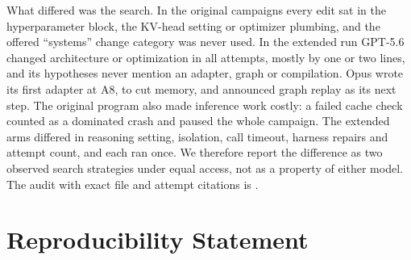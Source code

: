 \documentclass{article}
\begin{document}
\begin{table}[H]
\caption{The inference-editing surface and conditions of each AutoPareto search, read from the candidate sources and attempt records. ``Own inference code'' counts candidate sources that define the hook. Opus's failed A9 also wrote one, but its source was not kept. Opus's evaluator change fixed an FP32 correctness check that crashed on the first candidate adapter (A8), which was then re-run unchanged.}\label{tab:access}
\centering\scriptsize\setlength{\tabcolsep}{3pt}\renewcommand{\arraystretch}{1.12}
\end{table}

What differed was the search. In the original campaigns every edit sat in the hyperparameter block, the KV-head setting or optimizer plumbing, and the offered ``systems'' change category was never used. In the extended run GPT-5.6 changed architecture or optimization in all \CRCxAttempts{} attempts, mostly by one or two lines, and its hypotheses never mention an adapter, graph or compilation. Opus wrote its first adapter at A8, to cut memory, and announced graph replay as its next step. The original program also made inference work costly: a failed cache check counted as a dominated crash and paused the whole campaign. The extended arms differed in reasoning setting, isolation, call timeout, harness repairs and attempt count, and each ran once. We therefore report the difference as two observed search strategies under equal access, not as a property of either model. The audit with exact file and attempt citations is .

\section{Reproducibility Statement}\label{app:repro}
\end{document}
